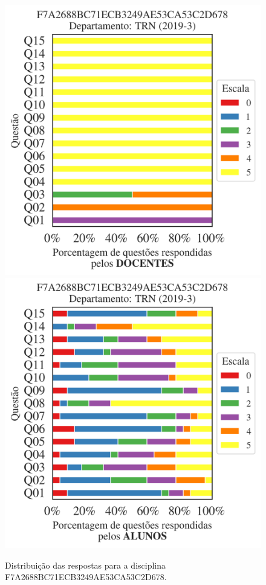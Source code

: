 \documentclass[a4paper,10pt]{article}
\begin{document}
\begin{figure}[h]
\centering
\includegraphics[width=0.485\linewidth]{analise_disciplina_departamento_TRN_F7A2688BC71ECB3249AE53CA53C2D678_docentes.png}
\includegraphics[width=0.485\linewidth]{analise_disciplina_departamento_TRN_F7A2688BC71ECB3249AE53CA53C2D678_alunos.png}
\caption{\label{fig:analise_geral_departamento}                Distribuição das respostas para a disciplina F7A2688BC71ECB3249AE53CA53C2D678. }
\end{figure}
\end{document}
